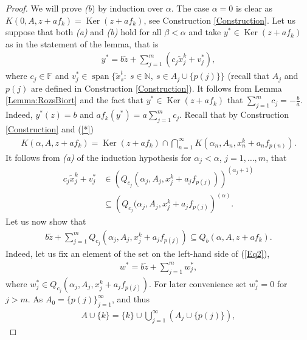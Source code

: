 \documentclass{amsart}
\theoremstyle{definition}
\begin{document}
\begin{proof}
    We will prove \textit{(b}) by induction over $\alpha$. The case $\alpha = 0$ is clear as $K(0,A,z+af_k) = \operatorname{Ker}(z+af_k)$, see Construction \ref{Construction}. Let us suppose that both \textit{(a)} and \textit{(b)} hold for all $\beta < \alpha$ and take $y^* \in \operatorname{Ker}(z + a f_k)$ as in the statement of the lemma, that is
    \begin{align*}
        y^* = b \widetilde{z} + \sum_{j=1}^m \left( c_j \widetilde{x}^k_j + v_j^* \right),
    \end{align*}
    where $c_j \in \mathbb{F}$ and $v_j^* \in \operatorname{span}\{\widetilde{x}^t_s: \; s \in \mathbb{N}, \: s \in A_j \cup \{p(j)\}\}$ (recall that $A_j$ and $p(j)$ are defined in Construction \ref{Construction}). It follows from Lemma \ref{Lemma:RozsBiort} and the fact that $y^* \in \operatorname{Ker}(z + a f_k)$ that $\sum_{j=1}^m c_j = -\frac{b}{a}$. Indeed, $y^*(z) = b$ and $af_k(y^*) = a \sum_{j=1}^m c_j$. Recall that by Construction \ref{Construction} and (\ref{*})
    \begin{align*}
        K(\alpha,A,z+ a f_k) = \operatorname{Ker}(z + af_k) \cap \bigcap_{n=1}^\infty K(\alpha_n, A_n, x^k_n +a_n f_{p(n)}).
    \end{align*}
    It follows from \textit{(a)} of the induction hypothesis for $\alpha_j < \alpha$, $j=1,\dots,m$, that
    \begin{align*}
        c_j \widetilde{x}^k_j + v_j^* &\in \left( Q_{c_j}(\alpha_j, A_j, x^k_j +a_j f_{p(j)}) \right)^{(\alpha_j + 1)} \\
        &\subseteq \left( Q_{c_j}(\alpha_j, A_j, x^k_j +a_j f_{p(j)} \right)^{(\alpha)}.
    \end{align*}
    Let us now show that
    \begin{align} \label{Eq2}
        b \widetilde{z} + \sum_{j=1}^m Q_{c_j}(\alpha_j, A_j, x^k_j +a_j f_{p(j)}) \subseteq Q_b (\alpha,A,z+ a f_k).
    \end{align}
    Indeed, let us fix an element of the set on the left-hand side of (\ref{Eq2}),
    \begin{align*}
        w^* = b \widetilde{z} + \sum_{j=1}^m w_j^*,
    \end{align*}
    where $w_j^* \in Q_{c_j}(\alpha_j,A_j,x^k_j+a_j f_{p(j)})$. For later convenience set $w_j^* = 0$ for $j > m$. As $A_0 = \{p(j)\}_{j=1}^\infty$, and thus
    \begin{align*}
        A \cup \{k\} = \{k\} \cup \bigcup_{j=1}^\infty (A_j \cup \{p(j)\}),
    \end{align*}

\end{proof}
\end{document}
